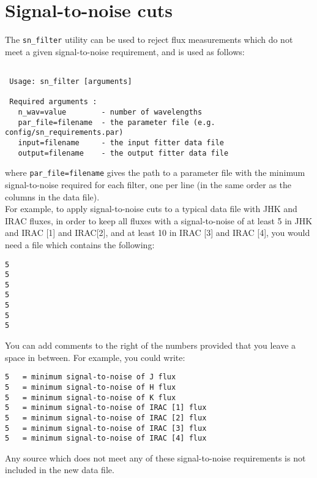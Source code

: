 \documentclass[letterpaper,11pt]{report}
\begin{document}
\newpage

\section{Signal-to-noise cuts}
\label{s:snfilter}

The \texttt{sn\_filter} utility can be used to reject flux measurements which do not meet a given signal-to-noise requirement, and is used as follows:\\

\begin{Verbatim}[frame=single,label=Syntax]

 Usage: sn_filter [arguments]
 
 Required arguments :
   n_wav=value        - number of wavelengths
   par_file=filename  - the parameter file (e.g. config/sn_requirements.par)
   input=filename     - the input fitter data file
   output=filename    - the output fitter data file

\end{Verbatim}

where \texttt{par\_file=filename} gives the path to a parameter file with the minimum signal-to-noise required for each filter, one per line (in the same order as the columns in the data file).\\

For example, to apply signal-to-noise cuts to a typical data file with JHK and IRAC fluxes, in order to keep all fluxes with a signal-to-noise of at least 5 in JHK and IRAC [1] and IRAC[2], and at least 10 in IRAC [3] and IRAC [4], you would need a file which contains the following:

\begin{verbatim}
5
5
5
5
5
5
5
\end{verbatim}

You can add comments to the right of the numbers provided that you leave a space in between. For example, you could write:

\begin{verbatim}
5   = minimum signal-to-noise of J flux
5   = minimum signal-to-noise of H flux
5   = minimum signal-to-noise of K flux
5   = minimum signal-to-noise of IRAC [1] flux
5   = minimum signal-to-noise of IRAC [2] flux
5   = minimum signal-to-noise of IRAC [3] flux
5   = minimum signal-to-noise of IRAC [4] flux
\end{verbatim}

Any source which does not meet any of these signal-to-noise requirements is not included in the new data file.\\
\end{document}
